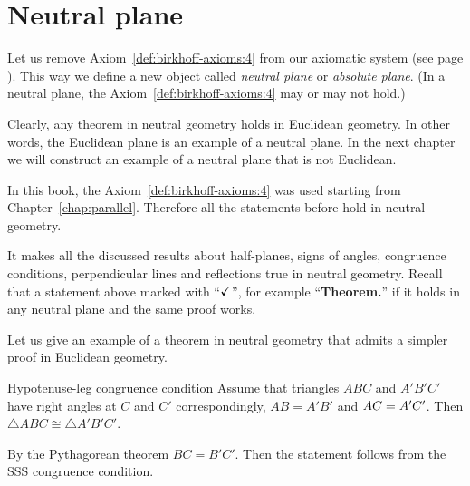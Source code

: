 \chapter{Neutral plane}\label{chap:non-euclid}

Let us remove Axiom~\ref{def:birkhoff-axioms:4} from our axiomatic system (see page \pageref{def:birkhoff-axioms:0}).
This way we define a new object called 
\emph{neutral plane} or \emph{absolute plane}.
(In a neutral plane, the Axiom~\ref{def:birkhoff-axioms:4} may or may not hold.)

Clearly, any theorem in neutral geometry holds in Euclidean geometry.
In other words, the Euclidean plane is an example of a neutral plane. 
In the next chapter we will construct an example of a neutral plane that is not Euclidean.

In this book, 
the Axiom~\ref{def:birkhoff-axioms:4} was used starting from Chapter~\ref{chap:parallel}.
Therefore all the statements before hold in neutral geometry.

It makes all the discussed results
about
half-planes,
signs of angles,
congruence conditions,
perpendicular lines and reflections 
true in neutral geometry.
Recall that a statement above marked with ``$\checkmark$'',\label{a-mark} for example ``\textbf{Theorem.\abs}'' if it holds in any neutral plane and the same proof works.


Let us give an example of a theorem in neutral geometry that admits a simpler proof in Euclidean geometry. 

\begin{thm}{Hypotenuse-leg congruence condition}
Assume that triangles $ABC$ and $A'B'C'$
have right angles at $C$ and $C'$ correspondingly, 
$AB=A'B'$ and $AC\z=A'C'$.
Then $\triangle ABC\cong\triangle A'B'C'$.
\end{thm}


By the Pythagorean theorem $BC=B'C'$.
Then the statement follows from the SSS congruence condition.
\qeds

